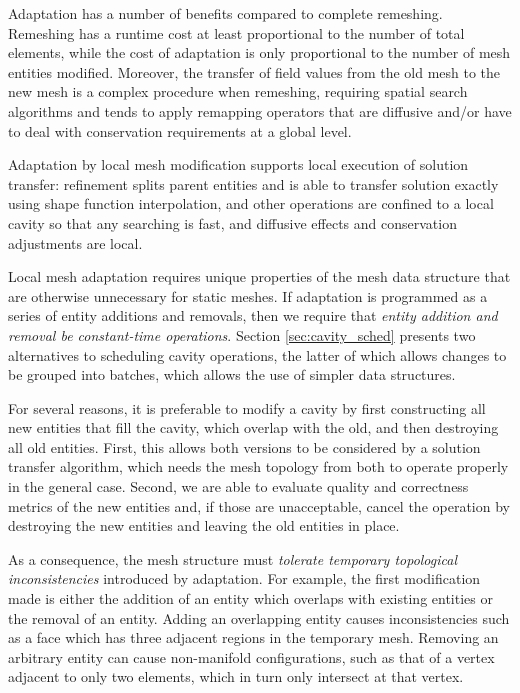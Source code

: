 Adaptation has a number of benefits compared to complete remeshing.
Remeshing has a runtime cost at least proportional to the number
of total elements, while the cost of adaptation is only proportional
to the number of mesh entities modified.
Moreover, the transfer of field values from the old mesh
to the new mesh is a complex procedure when remeshing,
requiring spatial search algorithms and
tends to apply remapping operators that are diffusive and/or
have to deal with conservation requirements at a global level.

Adaptation by local mesh modification supports local execution
of solution transfer: refinement splits
parent entities and is able to transfer solution exactly using
shape function interpolation, and other operations are confined
to a local cavity so that any searching is fast,
and diffusive effects and conservation adjustments are local.

Local mesh adaptation requires unique properties of the
mesh data structure that are otherwise unnecessary for
static meshes.
If adaptation is programmed as a series of entity
additions and removals, then we require that \emph{entity
addition and removal be constant-time operations}.
Section \ref{sec:cavity_sched} presents two alternatives
to scheduling cavity operations, the latter of which
allows changes to be grouped into batches, which allows
the use of simpler data structures.

For several reasons, it is preferable to modify a cavity
by first constructing all new entities that fill the cavity,
which overlap with the old, and then destroying all old entities.
First, this allows both versions to be considered by a solution
transfer algorithm, which needs the mesh topology from both
to operate properly in the general case.
Second, we are able to evaluate quality and correctness metrics
of the new entities and, if those are unacceptable, cancel the
operation by destroying the new entities and leaving
the old entities in place.

As a consequence, the mesh structure must \emph{tolerate temporary
topological inconsistencies} introduced by adaptation.
For example, the first modification made is either the addition
of an entity which overlaps with existing entities
or the removal of an entity.
Adding an overlapping entity causes inconsistencies such as
a face which has three adjacent regions in the temporary mesh.
Removing an arbitrary entity can cause non-manifold configurations,
such as that of a vertex adjacent to only two elements, which
in turn only intersect at that vertex.

